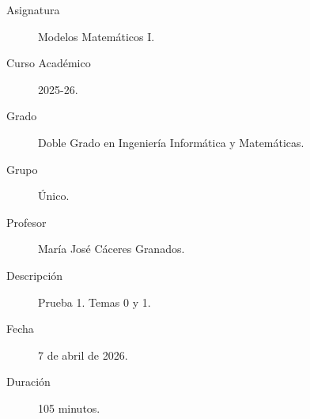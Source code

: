 \documentclass[12pt]{article}
\begin{document}

    
    

    \begin{description}
        \item[Asignatura] Modelos Matemáticos I.
        \item[Curso Académico] 2025-26.
        \item[Grado] Doble Grado en Ingeniería Informática y Matemáticas.
        \item[Grupo] Único.
        \item[Profesor] María José Cáceres Granados.
        \item[Descripción] Prueba 1. Temas 0 y 1.
        \item[Fecha] 7 de abril de 2026.
        \item[Duración] 105 minutos.
    
    \end{description}
    \newpage
    
\end{document}
